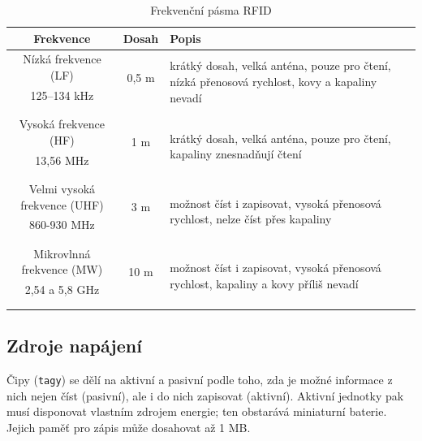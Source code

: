 \documentclass[czech,BP]{thesiskiv}
\begin{document}
\begin{table}[ht]
\centering
\begin{tabular}{ c | c | p{5cm}}
 	\textbf{Frekvence} & \textbf{Dosah} & \textbf{Popis} \\ \hline\hline
    Nízká frekvence (LF) & \multirow{2}{*}{0,5 m} & \multirow{4}{5cm}{krátký dosah, velká anténa, pouze pro čtení, nízká přenosová rychlost, kovy a kapaliny nevadí} \\
    125–134 kHz &  & \\ 
    &  & \\ &  & \\ \hline
    
    Vysoká frekvence (HF) & \multirow{2}{*}{1 m} & \multirow{4}{5cm}{krátký dosah, velká anténa, pouze pro čtení, kapaliny znesnadňují čtení}  \\ 
	13,56 MHz &  & \\ 
	&  & \\ &  & \\ \hline       
	
    Velmi vysoká frekvence (UHF) & \multirow{2}{*}{3 m} &  \multirow{4}{5cm}{možnost číst i zapisovat, vysoká přenosová rychlost, nelze číst přes kapaliny }\\  
    860-930 MHz &  & \\ 
    &  & \\ &  & \\ \hline
    
    Mikrovlnná frekvence (MW) &  \multirow{2}{*}{10 m} & \multirow{4}{5cm}{možnost číst i zapisovat, vysoká přenosová rychlost, kapaliny a kovy příliš nevadí } \\
	2,54 a 5,8 GHz &  & \\ 
	&  & \\ &  & \\ \hline
\end{tabular}
\caption{Frekvenční pásma RFID}
\label{table:rfid_frekvence}
\end{table}

\newpage

\subsection{Zdroje napájení}
Čipy (\texttt{tagy}) se dělí na aktivní a pasivní podle toho, zda je možné informace z nich nejen číst (pasivní), ale i do nich zapisovat (aktivní). Aktivní jednotky pak musí disponovat vlastním zdrojem energie; ten obstarává miniaturní baterie. Jejich paměť pro zápis může dosahovat až 1 MB.\cite{dolevcek2010identifikace}
\end{document}
